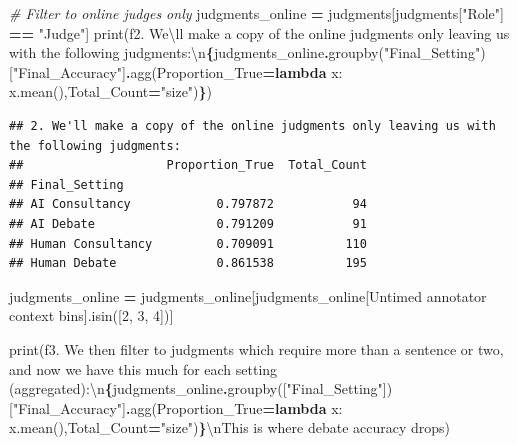 \documentclass[
]{article}
\newenvironment{Shaded}{\begin{snugshade}}{\end{snugshade}}
\newcommand{\BuiltInTok}[1]{#1}
\newcommand{\CharTok}[1]{\textcolor[rgb]{0.31,0.60,0.02}{#1}}
\newcommand{\CommentTok}[1]{\textcolor[rgb]{0.56,0.35,0.01}{\textit{#1}}}
\newcommand{\KeywordTok}[1]{\textcolor[rgb]{0.13,0.29,0.53}{\textbf{#1}}}
\newcommand{\NormalTok}[1]{#1}
\newcommand{\OperatorTok}[1]{\textcolor[rgb]{0.81,0.36,0.00}{\textbf{#1}}}
\newcommand{\SpecialCharTok}[1]{\textcolor[rgb]{0.81,0.36,0.00}{\textbf{#1}}}
\newcommand{\SpecialStringTok}[1]{\textcolor[rgb]{0.31,0.60,0.02}{#1}}
\newcommand{\StringTok}[1]{\textcolor[rgb]{0.31,0.60,0.02}{#1}}
\begin{document}
\begin{Shaded}
\begin{Highlighting}[]
\CommentTok{\# Filter to online judges only}
\NormalTok{judgments\_online }\OperatorTok{=}\NormalTok{ judgments[judgments[}\StringTok{"Role"}\NormalTok{] }\OperatorTok{==} \StringTok{"Judge"}\NormalTok{]}
\BuiltInTok{print}\NormalTok{(}\SpecialStringTok{f\textquotesingle{}2. We}\CharTok{\textbackslash{}\textquotesingle{}}\SpecialStringTok{ll make a copy of the online judgments only leaving us with the following judgments:}\CharTok{\textbackslash{}n}\SpecialCharTok{\{}\NormalTok{judgments\_online}\SpecialCharTok{.}\NormalTok{groupby(}\StringTok{"Final\_Setting"}\NormalTok{)[}\StringTok{"Final\_Accuracy"}\NormalTok{]}\SpecialCharTok{.}\NormalTok{agg(Proportion\_True}\OperatorTok{=}\KeywordTok{lambda}\NormalTok{ x: x.mean(),Total\_Count}\OperatorTok{=}\StringTok{"size"}\NormalTok{)}\SpecialCharTok{\}}\SpecialStringTok{\textquotesingle{}}\NormalTok{)}
\end{Highlighting}
\end{Shaded}

\begin{verbatim}
## 2. We'll make a copy of the online judgments only leaving us with the following judgments:
##                    Proportion_True  Total_Count
## Final_Setting                                  
## AI Consultancy            0.797872           94
## AI Debate                 0.791209           91
## Human Consultancy         0.709091          110
## Human Debate              0.861538          195
\end{verbatim}

\begin{Shaded}
\begin{Highlighting}[]
\NormalTok{judgments\_online }\OperatorTok{=}\NormalTok{ judgments\_online[judgments\_online[}\StringTok{\textquotesingle{}Untimed annotator context bins\textquotesingle{}}\NormalTok{].isin([}\StringTok{\textquotesingle{}2\textquotesingle{}}\NormalTok{, }\StringTok{\textquotesingle{}3\textquotesingle{}}\NormalTok{, }\StringTok{\textquotesingle{}4\textquotesingle{}}\NormalTok{])]}

\BuiltInTok{print}\NormalTok{(}\SpecialStringTok{f\textquotesingle{}3. We then filter to judgments which require more than a sentence or two, and now we have this much for each setting (aggregated):}\CharTok{\textbackslash{}n}\SpecialCharTok{\{}\NormalTok{judgments\_online}\SpecialCharTok{.}\NormalTok{groupby([}\StringTok{"Final\_Setting"}\NormalTok{])[}\StringTok{"Final\_Accuracy"}\NormalTok{]}\SpecialCharTok{.}\NormalTok{agg(Proportion\_True}\OperatorTok{=}\KeywordTok{lambda}\NormalTok{ x: x.mean(),Total\_Count}\OperatorTok{=}\StringTok{"size"}\NormalTok{)}\SpecialCharTok{\}}\CharTok{\textbackslash{}n}\SpecialStringTok{This is where debate accuracy drops\textquotesingle{}}\NormalTok{)}
\end{Highlighting}
\end{Shaded}
\end{document}

